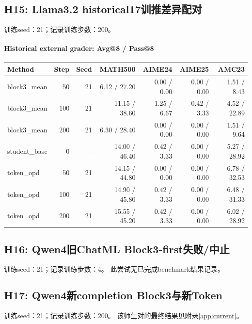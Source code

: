\subsection{H15: Llama3.2 historical17训推差异配对}
\label{history:llama_historical}
训练seed：21；记录训练步数：200。
\paragraph{Historical external grader: Avg@8 / Pass@8}
{\footnotesize\setlength{\tabcolsep}{3.5pt}
\begin{longtable}{@{}p{1.4in}rrrrrr@{}}
\toprule
Method & Step & Seed & MATH500 & AIME24 & AIME25 & AMC23 \\
\midrule\endhead
block3\_\allowbreak{}mean & 50 & 21 & 6.12 / 27.20 & 0.00 / 0.00 & 0.00 / 0.00 & 1.51 / 8.43 \\
block3\_\allowbreak{}mean & 100 & 21 & 11.15 / 38.60 & 1.25 / 6.67 & 0.42 / 3.33 & 4.52 / 22.89 \\
block3\_\allowbreak{}mean & 200 & 21 & 6.30 / 28.40 & 0.00 / 0.00 & 0.00 / 0.00 & 1.51 / 9.64 \\
student\_\allowbreak{}base & 0 & -- & 14.00 / 46.40 & 0.42 / 3.33 & 0.00 / 0.00 & 5.27 / 28.92 \\
token\_\allowbreak{}opd & 50 & 21 & 14.15 / 44.80 & 0.00 / 0.00 & 0.00 / 0.00 & 6.78 / 32.53 \\
token\_\allowbreak{}opd & 100 & 21 & 14.90 / 45.80 & 0.42 / 3.33 & 0.00 / 0.00 & 6.48 / 31.33 \\
token\_\allowbreak{}opd & 200 & 21 & 15.55 / 45.20 & 0.42 / 3.33 & 0.00 / 0.00 & 6.02 / 28.92 \\
\bottomrule\end{longtable}
}
\subsection{H16: Qwen4旧ChatML Block3-first失败/中止}
\label{history:qwen4_chatml_stopped}
训练seed：21；记录训练步数：4。
此尝试无已完成benchmark结果记录。
\subsection{H17: Qwen4新completion Block3与新Token}
\label{history:qwen4_completion}
训练seed：21；记录训练步数：200。
该师生对的最终结果见附录\ref{app:current}。
